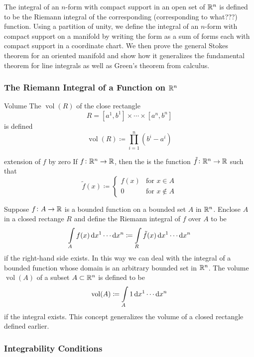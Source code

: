 The integral of an \(n\)-form with compact support in an open set of \(\mathbb{R}^n\) is defined to be the Riemann integral of the corresponding (corresponding to what???) function.
Using a partition of unity, we define the integral of an \(n\)-form with compact support on a manifold by writing the form as a sum of forms each with compact support in a coordinate chart.
We then prove the general Stokes theorem for an oriented manifold and show how it generalizes the fundamental theorem for line integrals as well as Green's theorem from calculus.

\subsubsection{The Riemann Integral of a Function on \(\mathbb{R}^n\)}

\begin{definition}{Volume}{}
    The  \(\operatorname{vol}(R)\) of the close rectangle 
    \[
        R = [a^1, b^1] \times \cdots \times [a^n, b^n]
    \]
    is defined 
    \[
        \operatorname{vol}(R) \coloneqq \prod_{i=1}^n (b^i - a^i)
    \]
\end{definition}
\begin{definition}{extension of \(f\) by zero}{}
    If \(f \colon \mathbb{R}^n \rightarrow \mathbb{R}\), then the  is the function \(\tilde{f} \colon \mathbb{R}^n \rightarrow \mathbb{R}\) such that 
    \[
        \tilde{f}(x) \coloneqq \begin{cases}
            f(x) & \text{for } x\in A \\  
            0 & \text{for } x\notin A 
        \end{cases}    
    \]
\end{definition}
Suppose \(f \colon A \rightarrow \mathbb{R}\) is a bounded function on a bounded set \(A\) in \(\mathbb{R}^n\).
Enclose \(A\) in a closed rectange \(R\) and define the Riemann integral of \(f\) over \(A\) to be 
\[
    \int\limits_A  f(x) \dif x^1 \cdots \dif x^n \coloneqq \int\limits_R \tilde{f}(x)  \dif x^1 \cdots \dif x^n
\]
if the right-hand side exists. 
In this way we can deal with the integral of a bounded function whose domain is an arbitrary bounded set in \(\mathbb{R}^n\).
The volume \(\operatorname{vol}(A)\) of a subset \(A \subset \mathbb{R}^n\) is defined to be
\[
    \operatorname{vol}(A) \coloneqq \int\limits_A  1 \dif x^1 \cdots \dif x^n 
\]
if the integral exists.
This concept generalizes the volume of a closed rectangle defined earlier.

\subsubsection{Integrability Conditions}

